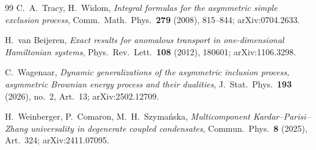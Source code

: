 \documentclass[11pt]{article}
\theoremstyle{plain}
\theoremstyle{definition}
\theoremstyle{remark}
\begin{document}
\begin{thebibliography}{99}
 C.~A.~Tracy, H.~Widom, \emph{Integral formulas for the asymmetric simple
exclusion process}, Comm.~Math.~Phys.~\textbf{279} (2008), 815--844; arXiv:0704.2633.

 H.~van Beijeren, \emph{Exact results for anomalous transport
in one-dimensional Hamiltonian systems}, Phys.~Rev.~Lett.~\textbf{108} (2012),
180601; arXiv:1106.3298.

 C.~Wagenaar, \emph{Dynamic generalizations of the asymmetric
inclusion process, asymmetric Brownian energy process and their dualities},
J.~Stat.~Phys.~\textbf{193} (2026), no.~2, Art.~13; arXiv:2502.12709.

 H.~Weinberger, P.~Comaron, M.~H.~Szyma\'nska, \emph{Multicomponent
Kardar--Parisi--Zhang universality in degenerate coupled condensates},
Commun.~Phys.~\textbf{8} (2025), Art.~324; arXiv:2411.07095.

\end{thebibliography}
\end{document}
